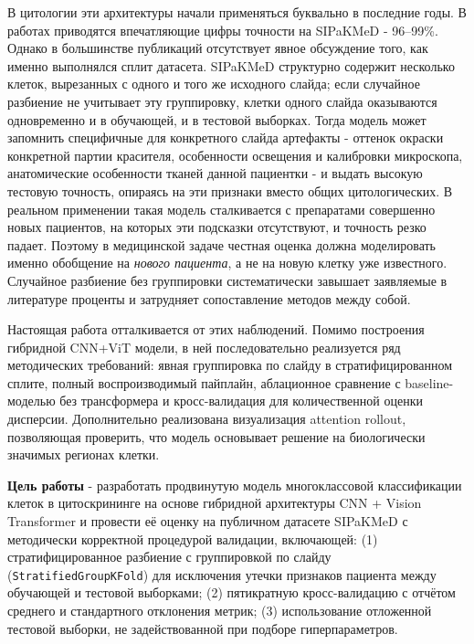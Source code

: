 \documentclass[14pt,a4paper]{extreport}
\begin{document}
В цитологии эти архитектуры начали применяться буквально в последние годы.
В работах \cite{cerviformer2023, cervigan2025, hybridvit2025} приводятся
впечатляющие цифры точности на SIPaKMeD - 96--99\%. Однако в большинстве
публикаций отсутствует явное обсуждение того, как именно выполнялся сплит
датасета. SIPaKMeD структурно содержит несколько клеток, вырезанных с
одного и того же исходного слайда; если случайное разбиение не учитывает
эту группировку, клетки одного слайда оказываются одновременно и в
обучающей, и в тестовой выборках. Тогда модель может запомнить специфичные
для конкретного слайда артефакты - оттенок окраски конкретной партии
красителя, особенности освещения и калибровки микроскопа, анатомические
особенности тканей данной пациентки - и выдать высокую тестовую точность,
опираясь на эти признаки вместо общих цитологических. В реальном применении
такая модель сталкивается с препаратами совершенно новых пациентов, на
которых эти подсказки отсутствуют, и точность резко падает. Поэтому в
медицинской задаче честная оценка должна моделировать именно обобщение на
\textit{нового пациента}, а не на новую клетку уже известного. Случайное
разбиение без группировки систематически завышает заявляемые в литературе
проценты и затрудняет сопоставление методов между собой.

Настоящая работа отталкивается от этих наблюдений. Помимо построения
гибридной CNN+ViT модели, в ней последовательно реализуется ряд методических
требований: явная группировка по слайду в стратифицированном сплите,
полный воспроизводимый пайплайн, аблационное сравнение с baseline-моделью
без трансформера и кросс-валидация для количественной оценки дисперсии.
Дополнительно реализована визуализация attention rollout, позволяющая
проверить, что модель основывает решение на биологически значимых регионах
клетки.

\textbf{Цель работы} - разработать продвинутую модель многоклассовой
классификации клеток в цитоскрининге на основе гибридной архитектуры CNN +
Vision Transformer и провести её оценку на публичном датасете SIPaKMeD с
методически корректной процедурой валидации, включающей: (1)
стратифицированное разбиение с группировкой по слайду
(\texttt{StratifiedGroupKFold}) для исключения утечки признаков пациента
между обучающей и тестовой выборками; (2) пятикратную кросс-валидацию
с отчётом среднего и стандартного отклонения метрик; (3) использование
отложенной тестовой выборки, не задействованной при подборе
гиперпараметров.
\end{document}
